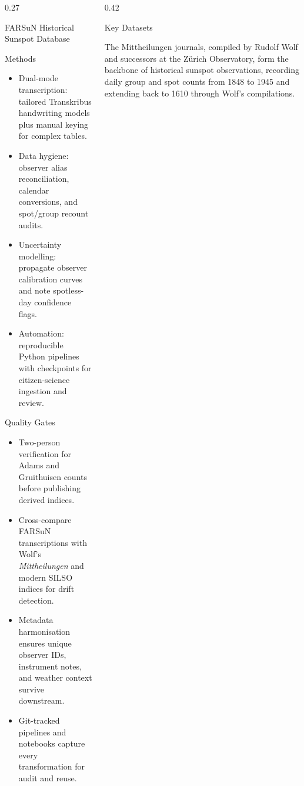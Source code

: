 \documentclass[final]{beamer}
\newcommand{\datasetbox}[2]{%
  \tcbox[colframe=#2,colback=#2!12!white,boxrule=0.6pt,arc=2mm,left=4mm,right=4mm,top=1mm,bottom=1mm]{\textbf{#1}}%
}
\newenvironment{tightblock}[1]{%
  \begin{block}{#1}\vspace{0.6em}
}{\vspace{0.6em}\end{block}}
\begin{document}
\begin{frame}[t]
\begin{columns}[t,totalwidth=0.98\paperwidth]
\begin{column}{0.27\paperwidth}
\begin{tightblock}{FARSuN Historical Sunspot Database}
\end{tightblock}

\begin{tightblock}{Methods}
\begin{itemize}
  \item Dual-mode transcription: tailored Transkribus handwriting models plus manual keying for complex tables.
  \item Data hygiene: observer alias reconciliation, calendar conversions, and spot/group recount audits.
  \item Uncertainty modelling: propagate observer calibration curves and note spotless-day confidence flags.
  \item Automation: reproducible Python pipelines with checkpoints for citizen-science ingestion and review.
\end{itemize}
\end{tightblock}

\begin{tightblock}{Quality Gates}
\begin{itemize}
  \item Two-person verification for Adams and Gruithuisen counts before publishing derived indices.
  \item Cross-compare FARSuN transcriptions with Wolf's \emph{Mittheilungen} and modern SILSO indices for drift detection.
  \item Metadata harmonisation ensures unique observer IDs, instrument notes, and weather context survive downstream.
  \item Git-tracked pipelines and notebooks capture every transformation for audit and reuse.
\end{itemize}
\end{tightblock}

\end{column}


\begin{column}{0.42\paperwidth}
\begin{tightblock}{Key Datasets}
  \datasetbox{Mittheilungen Dataset}{codegreen}
The Mittheilungen journals, compiled by Rudolf Wolf and successors at the Zürich Observatory, form the backbone of historical sunspot observations, recording daily group and spot counts from 1848 to 1945 and extending back to 1610 through Wolf's compilations.%


\end{tightblock}
\end{column}
\end{columns}
\end{frame}
\end{document}
